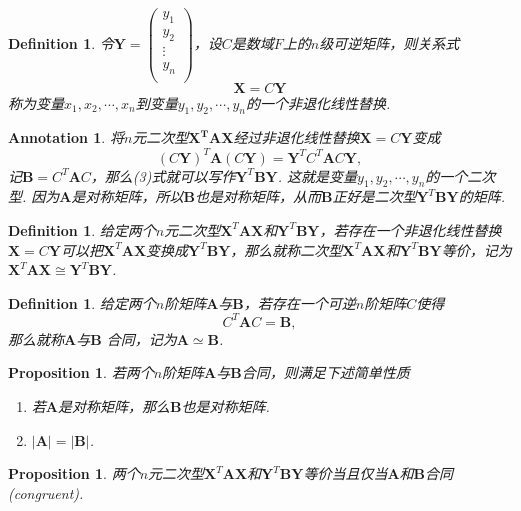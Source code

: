 \documentclass{article}
\newtheorem{proposition}[theorem]{Proposition}
\newtheorem{definition}[theorem]{Definition}
\newtheorem{annotation}[theorem]{Annotation}
\newcommand{\mbf}[1]{\bm{#1}}
\begin{document}
\begin{definition}
\rm 令$\mbf{Y}=\begin{pmatrix}
y_1 \\
y_2 \\
\vdots \\
y_n \\
\end{pmatrix}$，设$C$是数域$F$上的$n$级可逆矩阵，则关系式
$$
\mbf{X} = C\mbf{Y}
$$
称为变量$x_1,x_2,\cdots,x_n$到变量$y_1,y_2,\cdots,y_n$的一个{\color{red}非退化线性替换}. 
\end{definition}

\begin{annotation}
\rm 将$n$元二次型$\mbf{X^T}\mbf{A}\mbf{X}$经过非退化线性替换$\mbf{X} = C\mbf{Y}$变成
\begin{equation}
(C\mbf{Y})^T\mbf{A}(C\mbf{Y}) = \mbf{Y}^TC^T\mbf{A}C\mbf{Y},
\end{equation}
记$\mbf{B}=C^T\mbf{A}C$，那么(3)式就可以写作$\mbf{Y}^T\mbf{B}\mbf{Y}$. 这就是变量$y_1,y_2,\cdots,y_n$的一个二次型. 因为$\mbf{A}$是对称矩阵，所以$\mbf{B}$也是对称矩阵，从而$\mbf{B}$正好是二次型$\mbf{Y}^T\mbf{B}\mbf{Y}$的矩阵.
\end{annotation}

\begin{definition}
\rm 给定两个$n$元二次型$\mbf{X}^T\mbf{A}\mbf{X}$和$\mbf{Y}^T\mbf{B}\mbf{Y}$，若存在一个非退化线性替换$\mbf{X} = C\mbf{Y}$可以把$\mbf{X}^T\mbf{A}\mbf{X}$变换成$\mbf{Y}^T\mbf{B}\mbf{Y}$，那么就称二次型$\mbf{X}^T\mbf{A}\mbf{X}$和$\mbf{Y}^T\mbf{B}\mbf{Y}$等价，记为$\mbf{X}^T\mbf{A}\mbf{X} \cong \mbf{Y}^T\mbf{B}\mbf{Y}$. 
\end{definition}

\begin{definition}
\rm 给定两个$n$阶矩阵$\mbf{A}$与$\mbf{B}$，若存在一个可逆$n$阶矩阵$C$使得
$$
C^T\mbf{A}C = \mbf{B},
$$
那么就称$\mbf{A}$与$\mbf{B}$ {\color{red}合同}，记为$\mbf{A} \simeq \mbf{B}$.
\end{definition}

\begin{proposition}
\rm 若两个$n$阶矩阵$\mbf{A}$与$\mbf{B}$合同，则满足下述简单性质
\begin{enumerate}
	\item 若$\mbf{A}$是对称矩阵，那么$\mbf{B}$也是对称矩阵. 
	\item $|\mbf{A}| = |\mbf{B}|$. 
\end{enumerate}
\end{proposition}


\begin{proposition}
\rm 两个$n$元二次型$\mbf{X}^T\mbf{A}\mbf{X}$和$\mbf{Y}^T\mbf{B}\mbf{Y}$等价当且仅当$\mbf{A}$和$\mbf{B}$合同(congruent).
\end{proposition}
\end{document}
